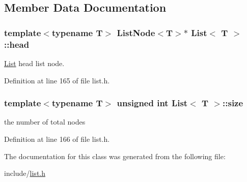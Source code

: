 \subsection{Member Data Documentation}
\hypertarget{class_list_a2b29518583aff577590c4f932824c5bf}{
\subsubsection[{head}]{\setlength{\rightskip}{0pt plus 5cm}template$<$typename T$>$ {\bf List\-Node}$<$T$>$$\ast$ {\bf List}$<$ T $>$\-::head\hspace{0.3cm}{\ttfamily [private]}}}\label{class_list_a2b29518583aff577590c4f932824c5bf}


\hyperlink{class_list}{List} head list node. 



Definition at line 165 of file list.\-h.

\hypertarget{class_list_a02655774bc5fa5f8bbff3d2b028525b0}{
\subsubsection[{size}]{\setlength{\rightskip}{0pt plus 5cm}template$<$typename T$>$ unsigned int {\bf List}$<$ T $>$\-::size\hspace{0.3cm}{\ttfamily [private]}}}\label{class_list_a02655774bc5fa5f8bbff3d2b028525b0}


the number of total nodes 



Definition at line 166 of file list.\-h.



The documentation for this class was generated from the following file\-:\begin{DoxyCompactItemize}
\item 
include/\hyperlink{list_8h}{list.\-h}\end{DoxyCompactItemize}
